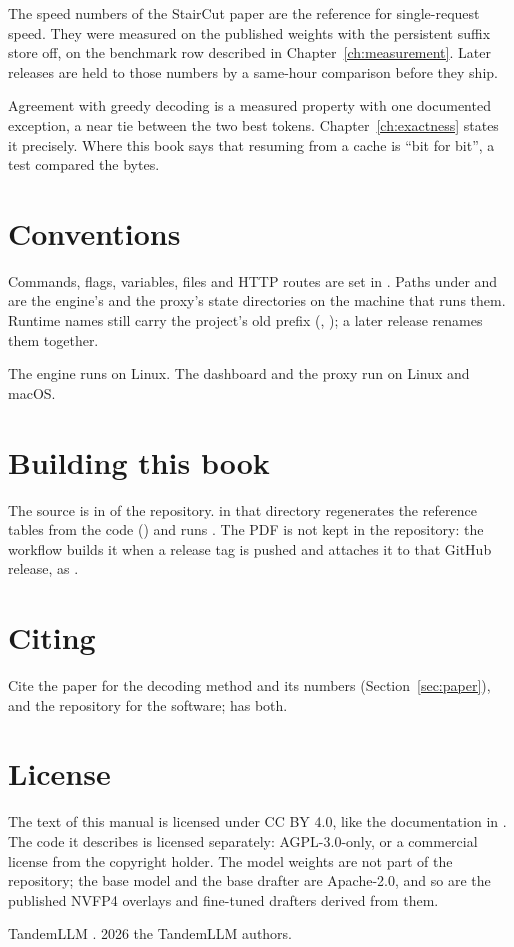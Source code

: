 The speed numbers of the StairCut paper are the reference for single-request speed. They were measured on the published weights with the persistent suffix store off, on the benchmark row described in Chapter~\ref{ch:measurement}. Later releases are held to those numbers by a same-hour comparison before they ship.

Agreement with greedy decoding is a measured property with one documented exception, a near tie between the two best tokens. Chapter~\ref{ch:exactness} states it precisely. Where this book says that resuming from a cache is \enquote{bit for bit}, a test compared the bytes.

\section*{Conventions}

Commands, flags, variables, files and HTTP routes are set in . Paths under  and  are the engine's and the proxy's state directories on the machine that runs them. Runtime names still carry the project's old prefix (, ); a later release renames them together.

The engine runs on Linux. The dashboard and the proxy run on Linux and macOS.

\section*{Building this book}

The source is in  of the repository.  in that directory regenerates the reference tables from the code () and runs . The PDF is not kept in the repository: the  workflow builds it when a release tag is pushed and attaches it to that GitHub release, as .

\section*{Citing}

Cite the paper for the decoding method and its numbers (Section~\ref{sec:paper}), and the repository for the software;  has both.

\section*{License}

The text of this manual is licensed under CC BY 4.0, like the documentation in . The code it describes is licensed separately: AGPL-3.0-only, or a commercial license from the copyright holder. The model weights are not part of the repository; the base model and the base drafter are Apache-2.0, and so are the published NVFP4 overlays and fine-tuned drafters derived from them.

\vfill
{\small\color{slate} TandemLLM \version. \textcopyright{} 2026 the TandemLLM authors.}
